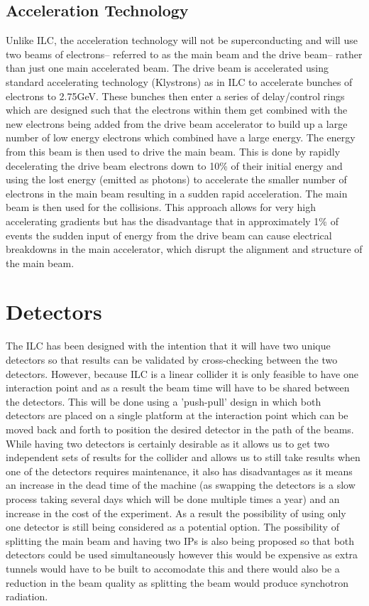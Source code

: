 \subsection{Acceleration Technology}
Unlike \ac{ILC}, the acceleration technology will not be superconducting and will use two beams of electrons-- referred to as the main beam and the drive beam-- rather than just one main accelerated beam. The drive beam is accelerated using standard accelerating technology (Klystrons) as in \ac{ILC} to accelerate bunches of electrons to 2.75GeV. These bunches then enter a series of delay/control rings which are designed such that the electrons within them get combined with the new electrons being added from the drive beam accelerator to build up a large number of low energy electrons which combined have a large energy. The energy from this beam is then used to drive the main beam. This is done by rapidly decelerating the drive beam electrons down to 10\% of their initial energy and using the lost energy (emitted as photons) to accelerate the smaller number of electrons in the main beam resulting in a sudden rapid acceleration. The main beam is then used for the collisions. This approach allows for very high accelerating gradients but has the disadvantage that in approximately 1\% of events the sudden input of energy from the drive beam can cause electrical breakdowns in the main accelerator, which disrupt the alignment and structure of the main beam.


\section{Detectors}
The \ac{ILC} has been designed with the intention that it will have two unique detectors so that results can be validated by cross-checking between the two detectors. However, because \ac{ILC} is a linear collider it is only feasible to have one interaction point and as a result the beam time will have to be shared between the detectors. This will be done using a 'push-pull' design in which both detectors are placed on a single platform at the interaction point which can be moved back and forth to position the desired detector in the path of the beams. While having two detectors is certainly desirable as it allows us to get two independent sets of results for the collider and allows us to still take results when one of the detectors requires maintenance, it also has disadvantages as it means an increase in the dead time of the machine (as swapping the detectors is a slow process taking several days which will be done multiple times a year) and an increase in the cost of the experiment. As a result the possibility of using only one detector is still being considered as a potential option. The possibility of splitting the main beam and having two IPs is also being proposed so that both detectors could be used simultaneously however this would be expensive as extra tunnels would have to be built to accomodate this and there would also be a reduction in the beam quality as splitting the beam would produce synchotron radiation.
